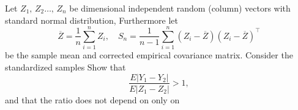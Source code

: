 Let $ Z_1,\,Z_2\dots,\,Z_n$ be dimensional independent random (column) vectors with standard normal distribution,  Furthermore let
\[ \overline Z = \frac {1}{n}\sum_{i = 1}^n Z_i,\quad S_n = \frac {1}{n - 1}\sum_{i = 1}^n(Z_i - \overline Z)(Z_i - \overline Z)^\top\]
be the sample mean and corrected empirical covariance matrix. Consider the standardized samples   Show that
\[ \frac {E|Y_1 - Y_2|}{E|Z_1 - Z_2|} > 1,\]
and that the ratio does not depend on  only on 